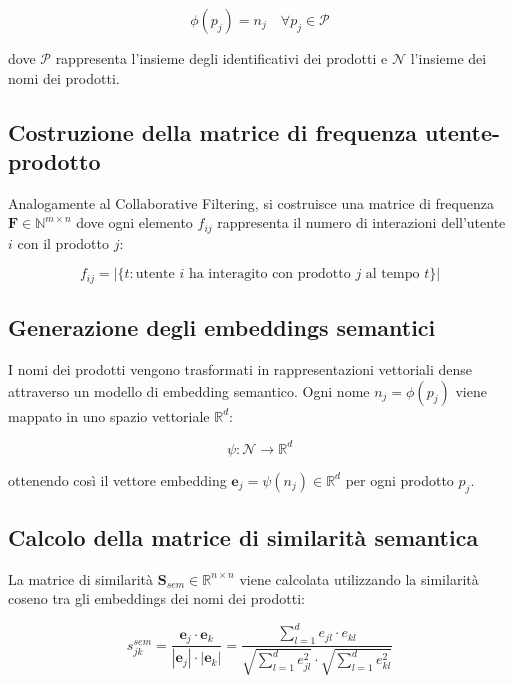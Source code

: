 \begin{equation}
\phi(p_j) = n_j \quad \forall p_j \in \mathcal{P}
\end{equation}

dove $\mathcal{P}$ rappresenta l'insieme degli identificativi dei prodotti e $\mathcal{N}$ l'insieme dei nomi dei prodotti.

\subsection{Costruzione della matrice di frequenza utente-prodotto}

Analogamente al Collaborative Filtering, si costruisce una matrice di frequenza $\mathbf{F} \in \mathbb{N}^{m \times n}$ dove ogni elemento $f_{ij}$ rappresenta il numero di interazioni dell'utente $i$ con il prodotto $j$:

\begin{equation}
f_{ij} = |\{t : \text{utente } i \text{ ha interagito con prodotto } j \text{ al tempo } t\}|
\end{equation}

\subsection{Generazione degli embeddings semantici}

I nomi dei prodotti vengono trasformati in rappresentazioni vettoriali dense attraverso un modello di embedding semantico. Ogni nome $n_j = \phi(p_j)$ viene mappato in uno spazio vettoriale $\mathbb{R}^d$:

\begin{equation}
\psi: \mathcal{N} \rightarrow \mathbb{R}^d
\end{equation}

ottenendo così il vettore embedding $\mathbf{e}_j = \psi(n_j) \in \mathbb{R}^d$ per ogni prodotto $p_j$.

\subsection{Calcolo della matrice di similarità semantica}

La matrice di similarità $\mathbf{S}_{sem} \in \mathbb{R}^{n \times n}$ viene calcolata utilizzando la similarità coseno tra gli embeddings dei nomi dei prodotti:

\begin{equation}
s_{jk}^{sem} = \frac{\mathbf{e}_j \cdot \mathbf{e}_k}{|\mathbf{e}_j| \cdot |\mathbf{e}_k|} = \frac{\sum_{l=1}^{d} e_{jl} \cdot e_{kl}}{\sqrt{\sum_{l=1}^{d} e_{jl}^2} \cdot \sqrt{\sum_{l=1}^{d} e_{kl}^2}}
\end{equation}


